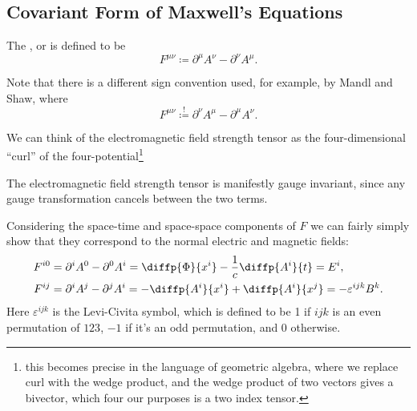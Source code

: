 \documentclass[fleqn]{NotesClass}
\begin{document}
\begin{appendices}
        \subsection{Covariant Form of Maxwell's Equations}
        The , or  is defined to be
        \begin{equation}
            F^{\mu\nu} \coloneqq \partial^\mu A^\nu - \partial^\nu A^\mu.
        \end{equation}
        \begin{wrn}
            Note that there is a different sign convention used, for example, by Mandl and Shaw, where
            \begin{equation}
                F^{\mu\nu} \stackrel{!}{\coloneqq} \partial^\nu A^\mu - \partial^\mu A^\nu.
            \end{equation}
        \end{wrn}
    
        We can think of the electromagnetic field strength tensor as the four-dimensional \enquote{curl} of the four-potential\footnote{this becomes precise in the language of geometric algebra, where we replace curl with the wedge product, and the wedge product of two vectors gives a bivector, which four our purposes is a two index tensor.}
        
        The electromagnetic field strength tensor is manifestly gauge invariant, since any gauge transformation cancels between the two terms.
        
        Considering the space-time and space-space components of \(F\) we can fairly simply show that they correspond to the normal electric and magnetic fields:
        \begin{align}
            F^{i0} &= \partial^iA^0 - \partial^0A^i = \diffp{\Phi}{x^i} - \frac{1}{c}\diffp{A^i}{t} = E^i,\\
            F^{ij} &= \partial^iA^j - \partial^jA^i = -\diffp{A^i}{x^i} + \diffp{A^i}{x^j} = -\varepsilon^{ijk}B^k.
        \end{align}
        Here \(\varepsilon^{ijk}\) is the Levi-Civita symbol, which is defined to be 1 if \(ijk\) is an even permutation of \(123\), \(-1\) if it's an odd permutation, and 0 otherwise.
        

\end{appendices}
\end{document}
